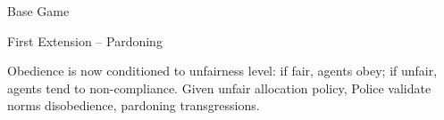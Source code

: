 \documentclass[xcolor={table}]{beamer}
\begin{document}
\begin{frame}[fragile=singleslide,t]
\begin{columns}[T]
\begin{column}{.58\textwidth}
\begin{block}{Base Game}
\begin{figure}[H]
  \centering
\end{figure}



\end{block} 



\begin{block}{First Extension -- Pardoning}

Obedience is now conditioned to unfairness level: if fair, agents obey; if unfair, agents tend to non-compliance. Given unfair allocation policy, Police validate norms disobedience, pardoning transgressions. 

\begin{columns}[c]
\begin{column}{.6\textwidth}
 

\end{column}
\end{columns}
\end{block}
\end{column}
\end{columns}
\end{frame}
\end{document}
